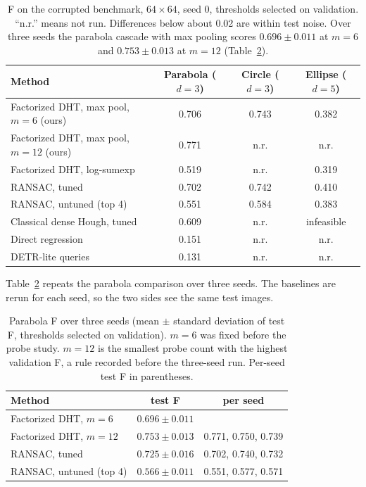 \documentclass[11pt]{article}
\begin{document}
\begin{table}[t]
\centering
\caption{F on the corrupted benchmark, $64\times64$, seed 0, thresholds selected on validation. ``n.r.'' means not run. Differences below about 0.02 are within test noise. Over three seeds the parabola cascade with max pooling scores $0.696\pm0.011$ at $m=6$ and $0.753\pm0.013$ at $m=12$ (Table~\ref{tab:seeds}).}
\label{tab:main}
\small
\begin{tabular}{lccc}
\toprule
\textbf{Method} & \textbf{Parabola ($d=3$)} & \textbf{Circle ($d=3$)} & \textbf{Ellipse ($d=5$)} \\
\midrule
Factorized DHT, max pool, $m=6$ (ours) & 0.706 & 0.743 & 0.382 \\
Factorized DHT, max pool, $m=12$ (ours) & 0.771 & n.r. & n.r. \\
Factorized DHT, log-sumexp       & 0.519 & n.r. & 0.319 \\
RANSAC, tuned                    & 0.702 & 0.742 & 0.410 \\
RANSAC, untuned (top 4)          & 0.551 & 0.584 & 0.383 \\
Classical dense Hough, tuned     & 0.609 & n.r. & infeasible \\
Direct regression                & 0.151 & n.r. & n.r. \\
DETR-lite queries                & 0.131 & n.r. & n.r. \\
\bottomrule
\end{tabular}
\end{table}

Table~\ref{tab:seeds} repeats the parabola comparison over three seeds. The baselines are rerun for each seed, so the two sides see the same test images.

\begin{table}[t]
\centering
\caption{Parabola F over three seeds (mean $\pm$ standard deviation of test F, thresholds selected on validation). $m=6$ was fixed before the probe study. $m=12$ is the smallest probe count with the highest validation F, a rule recorded before the three-seed run. Per-seed test F in parentheses.}
\label{tab:seeds}
\small
\begin{tabular}{lcc}
\toprule
\textbf{Method} & \textbf{test F} & \textbf{per seed} \\
\midrule
Factorized DHT, $m=6$   & $0.696\pm0.011$ & \\
Factorized DHT, $m=12$  & $0.753\pm0.013$ & 0.771, 0.750, 0.739 \\
RANSAC, tuned           & $0.725\pm0.016$ & 0.702, 0.740, 0.732 \\
RANSAC, untuned (top 4) & $0.566\pm0.011$ & 0.551, 0.577, 0.571 \\
\bottomrule
\end{tabular}
\end{table}
\end{document}
